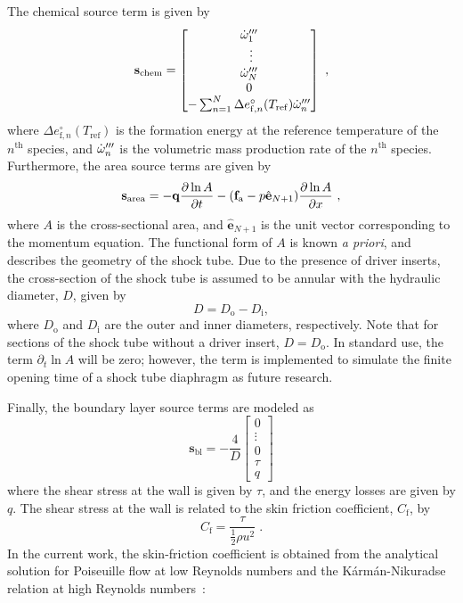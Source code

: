 The chemical source term is given by
\begin{equation}
	\mathbf{s}_\mathrm{chem} = \begin{bmatrix}
	\dot{\omega}^{\prime\prime\prime}_1 \\\
	\vdots\\
	\dot{\omega}^{\prime\prime\prime}_N\\
	0\\
	-\sum_{n=1}^N\Delta e_{\mathrm{f},n}^\circ(T_\mathrm{ref})\dot{\omega}^{\prime\prime\prime}_n
	\end{bmatrix}\ ,
\end{equation}
where $\Delta e_{\mathrm{f},n}^\circ(T_\mathrm{ref})$ is the formation energy at the reference temperature  of the $n^\mathrm{th}$ species, and $\dot{\omega}^{\prime\prime\prime}_n$ is the volumetric mass production rate of the $n^\mathrm{th}$ species. Furthermore, the area source terms are given by 
\begin{equation}
\mathbf{s}_\mathrm{area}=
-\mathbf{q}\frac{\p\ln A}{\p t} -(\mathbf{f}_\mathrm{a}-p\hat{\mathbf{e}}_{N+1})\frac{\p\ln A}{\p x}\ ,
\end{equation}
where $A$ is the cross-sectional area, and $\hat{\mathbf{e}}_{N+1}$ is the unit vector corresponding to the momentum equation. The functional form of $A$ is known \emph{a priori}, and describes the geometry of the shock tube. Due to the presence of driver inserts, the cross-section of the shock tube is assumed to be annular with the hydraulic diameter, $D$, given by
\begin{equation}
D=D_\mathrm{o}-D_\mathrm{i} ,
\end{equation}
where $D_\mathrm{o}$ and $D_\mathrm{i}$ are the outer and inner diameters, respectively. Note that for sections of the shock tube without a driver insert, $D=D_\mathrm{o}$. In standard use, the term $\partial_t \ln A$ will be zero; however, the term is implemented to simulate the finite opening time of a shock tube diaphragm as future research.

Finally, the boundary layer source terms are modeled as 
\begin{equation}\label{EQ_BLSRC}
	\mathbf{s}_\mathrm{bl}=-\frac{4}{D}\begin{bmatrix}
		0\\
		\vdots\\
		0\\
		\tau\\
		q
	\end{bmatrix}
\end{equation}
where the shear stress at the wall is given by $\tau$, and the energy losses are given by $q$. The shear stress at the wall is related to the skin friction coefficient, $C_\mathrm{f}$, by
\begin{equation}
\label{EQ_TAU}
C_{\mathrm{f}}=\frac{\tau}{\frac{1}{2}\rho u^{2}}\; .
\end{equation}
In the current work, the skin-friction coefficient is obtained from the analytical solution for Poiseuille flow at low Reynolds numbers and the K\'arm\'an-Nikuradse relation at high Reynolds numbers~\cite{KAYS_BOOK2005}:

